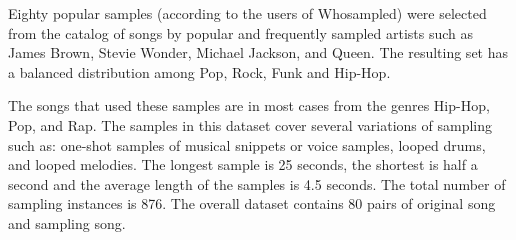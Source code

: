 \documentclass{article}
\begin{document}

Eighty popular samples (according to the users of Whosampled) were selected from the catalog of songs by popular and frequently sampled artists such as James Brown, Stevie Wonder, Michael Jackson, and Queen. The resulting set has a balanced distribution among Pop, Rock, Funk and Hip-Hop.

    The songs that used these samples are in most cases from the genres Hip-Hop, Pop, and Rap. The samples in this dataset cover several variations of sampling such as: one-shot samples of musical snippets or voice samples, looped drums, and looped melodies. The longest sample is 25 seconds, the shortest is half a second and the average length of the samples is 4.5 seconds. The total number of sampling instances is 876. %
The overall dataset contains 80 pairs of original song and sampling song.
\end{document}
